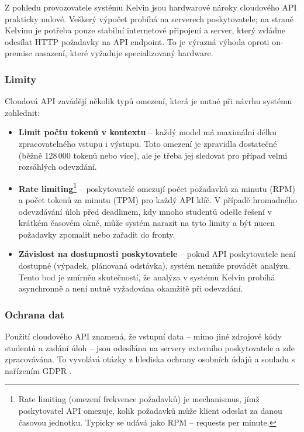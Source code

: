 Z pohledu provozovatele systému Kelvin jsou hardwarové nároky cloudového API prakticky nulové.
Veškerý výpočet probíhá na serverech poskytovatele; na straně Kelvinu je potřeba pouze stabilní internetové připojení a server, který zvládne odesílat HTTP požadavky na API endpoint.
To je výrazná výhoda oproti on-premise nasazení, které vyžaduje specializovaný hardware.

\subsubsection*{Limity}

Cloudová API zavádějí několik typů omezení, která je nutné při návrhu systému zohlednit:

\begin{itemize}
    \item \textbf{Limit počtu tokenů v kontextu} -- každý model má maximální délku zpracovatelného vstupu i výstupu.
    Toto omezení je zpravidla dostatečné (běžně 128\,000 tokenů nebo více), ale je třeba jej sledovat pro případ velmi rozsáhlých odevzdání.

    \item \textbf{Rate limiting}\footnote{Rate limiting (omezení frekvence požadavků) je mechanismus, jímž poskytovatel API omezuje, kolik požadavků může klient odeslat za danou časovou jednotku. Typicky se udává jako RPM -- requests per minute.}
    -- poskytovatelé omezují počet požadavků za minutu (RPM) a počet tokenů za minutu (TPM) pro každý API klíč.
    V případě hromadného odevzdávání úloh před deadlinem, kdy mnoho studentů odešle řešení v krátkém časovém okně, může systém narazit na tyto limity a být nucen požadavky zpomalit nebo zařadit do fronty.

    \item \textbf{Závislost na dostupnosti poskytovatele} -- pokud API poskytovatele není dostupné (výpadek, plánovaná odstávka), systém nemůže provádět analýzu.
    Tento bod je zmírněn skutečností, že analýza v systému Kelvin probíhá asynchronně a není nutně vyžadována okamžitě při odevzdání.
\end{itemize}

\subsubsection*{Ochrana dat}

Použití cloudového API znamená, že vstupní data -- mimo jiné zdrojové kódy studentů a zadání úloh -- jsou odesílána na servery externího poskytovatele a zde zpracovávána.
To vyvolává otázky z hlediska ochrany osobních údajů a souladu s nařízením GDPR \cite{gdpr2016}.

